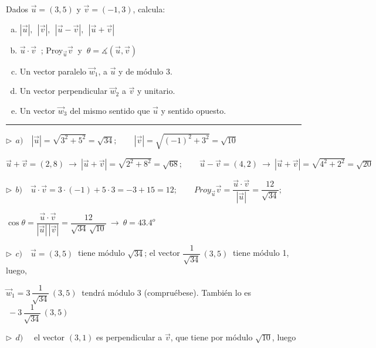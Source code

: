 \begin{miejercicio}	

Dados $\vec u=(3,5)$ y $\vec v=(-1,3)$, calcula:

\begin{enumerate}[a) ]
\item $|\vec u|,\ \ |\vec v|,\ \ |\vec u-\vec v|,\ \ |\vec u+\vec v|$
\item $\vec u \cdot \vec v \ $ ;  Proy$_{\vec u}\vec v	\ $ y $\ \theta=\measuredangle (\vec u, \vec v)$
\item Un vector paralelo $\vec w_1$, a  $\vec u$ y de módulo $3$.
\item Un vector perpendicular $\vec w_2$ a $\vec v$ y unitario.
\item Un vector $\vec w_3$ del mismo sentido que $\vec u$ y sentido opuesto. 
\end{enumerate}
	

\rule{250pt}{0.1pt}

\vspace{2mm} $\triangleright \ \ a) \quad |\vec u|=\sqrt{3^2+5^2}=\sqrt{34};\qquad |\vec v|=\sqrt{(-1)^2+3^2}=\sqrt{10}$

\vspace{2mm} $\vec u+\vec v=(2,8) \ \to \ |\vec u+\vec v|=\sqrt{2^2+8^2}=\sqrt{68};\qquad 
\vec u-\vec v=(4,2) \ \to \ |\vec u+\vec v|=\sqrt{4^2+2^2}=\sqrt{20}$

\vspace{4mm} $\triangleright \ \ b) \quad \vec u \cdot \vec v=3\cdot(-1)+5\cdot 3=-3+15=12; \qquad Proy_{\vec u}\vec v=\dfrac{\vec u \cdot \vec v}{|\vec u|}=\dfrac{12}{\sqrt{34}} ; $

\vspace{2mm} $ \cos \theta=\dfrac{\vec u\cdot \vec v}{|\vec u|\,|\vec v|}=\dfrac{12}{\sqrt{34}\, \sqrt{10}} \ \to \ \theta=43.4^o$

\vspace{4mm} $\triangleright \ \ c) \quad \vec u=(3,5)\ $ tiene módulo $\sqrt{34}$; el vector $\dfrac 1{\sqrt{34}}\, (3,5)\ $ tiene módulo 1, luego, 

\vspace{2mm} $\vec w_1=3\, \dfrac 1{\sqrt{34}}\, (3,5)\ $ tendrá módulo 3 (compruébese). \textcolor{gris}{También lo es $\ -3\, \dfrac 1{\sqrt{34}}\, (3,5)$}

\vspace{4mm} $\triangleright \ \ d) \quad $ el vector $(3,1)$ es perpendicular a $\vec v$, que tiene por módulo $\sqrt{10}$, luego


\end{miejercicio}

